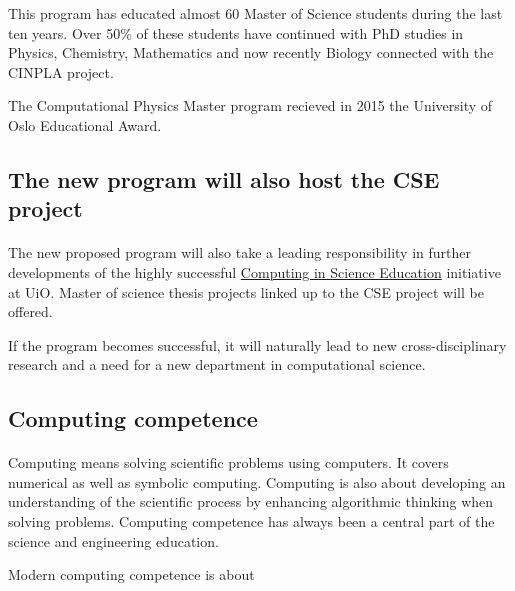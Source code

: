 \documentclass[%
oneside,                 %
final,                   %
10pt]{article}
\begin{document}
This program has educated almost 60 Master of Science students during
the last ten years.  Over 50\% of these students have continued with
PhD studies in Physics, Chemistry, Mathematics and now recently
Biology connected with the CINPLA project.

The Computational Physics Master program recieved in 2015 the University of Oslo Educational Award.



\subsection*{The new program will also host the CSE project}

\paragraph{}

The new proposed program will also take a leading responsibility in further
developments of the highly successful \href{{http://www.mn.uio.no/english/about/collaboration/cse/}}{Computing in Science Education} initiative at UiO.  Master of science thesis projects linked up to the CSE project will be offered.

If the program becomes successful, it will naturally lead to
new cross-disciplinary research and a need for a new department
in computational science.




\subsection*{Computing competence}

\paragraph{}
Computing means solving scientific problems using computers. It covers
numerical as well as symbolic computing. Computing is also about
developing an understanding of the scientific process by enhancing
algorithmic thinking when solving problems.  Computing competence has
always been a central part of the science and engineering
education.

Modern computing competence is about
\end{document}
